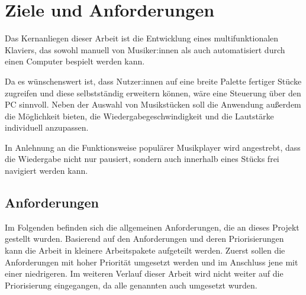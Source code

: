 \chapter{Ziele und Anforderungen} \label{Zielstellung}

\nocite{*}


Das Kernanliegen dieser Arbeit ist die Entwicklung eines multifunktionalen Klaviers,
das sowohl manuell von Musiker:innen als auch automatisiert durch einen Computer bespielt werden kann.

Da es wünschenswert ist, dass Nutzer:innen auf eine breite Palette fertiger Stücke zugreifen und diese selbstständig erweitern können,
wäre eine Steuerung über den PC sinnvoll.
Neben der Auswahl von Musikstücken soll die Anwendung außerdem die Möglichkeit bieten,
die Wiedergabegeschwindigkeit und die Lautstärke individuell anzupassen.

In Anlehnung an die Funktionsweise populärer Musikplayer wird angestrebt,
dass die Wiedergabe nicht nur pausiert, sondern auch innerhalb eines Stücks frei navigiert werden kann.

\newpage

\section{Anforderungen} \label{sec:zielstellung-anforderungen}

Im Folgenden befinden sich die allgemeinen Anforderungen, die an dieses Projekt gestellt wurden.
Basierend auf den Anforderungen und deren Priorisierungen kann die Arbeit in kleinere Arbeitspakete aufgeteilt werden.
Zuerst sollen die Anforderungen mit hoher Priorität umgesetzt werden und im Anschluss jene mit einer niedrigeren.
Im weiteren Verlauf dieser Arbeit wird nicht weiter auf die Priorisierung eingegangen, da alle genannten auch umgesetzt wurden.

